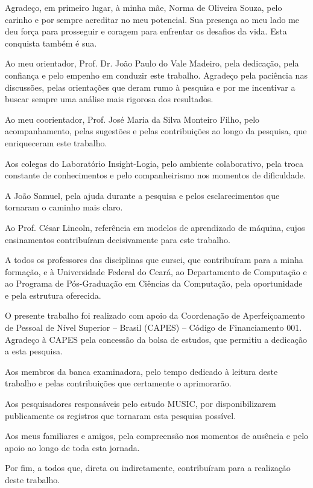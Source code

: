Agradeço, em primeiro lugar, à minha mãe, Norma de Oliveira Souza, pelo
carinho e por sempre acreditar no meu potencial. Sua presença ao meu lado me
deu força para prosseguir e coragem para enfrentar os desafios da vida. Esta
conquista também é sua.

Ao meu orientador, Prof. Dr. João Paulo do Vale Madeiro, pela dedicação, pela
confiança e pelo empenho em conduzir este trabalho. Agradeço pela paciência
nas discussões, pelas orientações que deram rumo à pesquisa e por me
incentivar a buscar sempre uma análise mais rigorosa dos resultados.

Ao meu coorientador, Prof. José Maria da Silva Monteiro Filho, pelo
acompanhamento, pelas sugestões e pelas contribuições ao longo da pesquisa,
que enriqueceram este trabalho.

Aos colegas do Laboratório Insight-Logia, pelo ambiente colaborativo, pela
troca constante de conhecimentos e pelo companheirismo nos momentos de
dificuldade.

A João Samuel, pela ajuda durante a pesquisa e pelos esclarecimentos que
tornaram o caminho mais claro.

Ao Prof. César Lincoln, referência em modelos de aprendizado de máquina, cujos
ensinamentos contribuíram decisivamente para este trabalho.

A todos os professores das disciplinas que cursei, que contribuíram para a
minha formação, e à Universidade Federal do Ceará, ao Departamento de
Computação e ao Programa de Pós-Graduação em Ciências da Computação, pela
oportunidade e pela estrutura oferecida.

O presente trabalho foi realizado com apoio da Coordenação de
Aperfeiçoamento de Pessoal de Nível Superior -- Brasil (CAPES) -- Código de
Financiamento 001. Agradeço à CAPES pela concessão da bolsa de estudos, que
permitiu a dedicação a esta pesquisa.

Aos membros da banca examinadora, pelo tempo dedicado à leitura deste
trabalho e pelas contribuições que certamente o aprimorarão.

Aos pesquisadores responsáveis pelo estudo MUSIC, por disponibilizarem
publicamente os registros que tornaram esta pesquisa possível.

Aos meus familiares e amigos, pela compreensão nos momentos de ausência e
pelo apoio ao longo de toda esta jornada.

Por fim, a todos que, direta ou indiretamente, contribuíram para a
realização deste trabalho.
